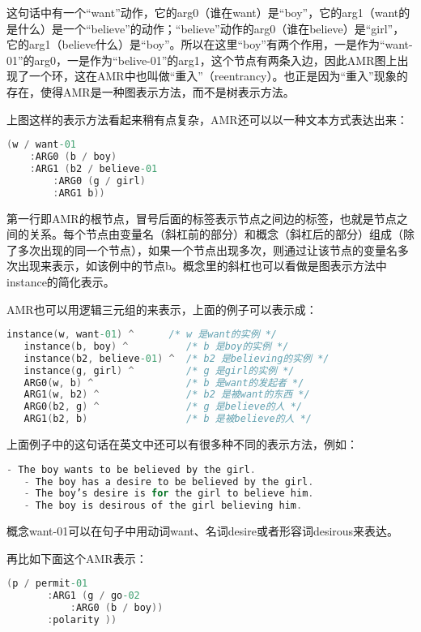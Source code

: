 \documentclass[master, winfont]{njuthesis}
\begin{document}
这句话中有一个“want”动作，它的arg0（谁在want）是“boy”，它的arg1（want的是什么）是一个“believe”的动作；“believe”动作的arg0（谁在believe）是“girl”，它的arg1（believe什么）是“boy”。所以在这里“boy”有两个作用，一是作为“want-01”的arg0，一是作为“belive-01”的arg1，这个节点有两条入边，因此AMR图上出现了一个环，这在AMR中也叫做“重入”（reentrancy）。也正是因为“重入”现象的存在，使得AMR是一种图表示方法，而不是树表示方法。

上图这样的表示方法看起来稍有点复杂，AMR还可以以一种文本方式表达出来：

\begin{lstlisting}[language=C]
(w / want-01 
   	:ARG0 (b / boy)
	:ARG1 (b2 / believe-01
		:ARG0 (g / girl)
		:ARG1 b))
\end{lstlisting}
 

第一行即AMR的根节点，冒号后面的标签表示节点之间边的标签，也就是节点之间的关系。每个节点由变量名（斜杠前的部分）和概念（斜杠后的部分）组成（除了多次出现的同一个节点），如果一个节点出现多次，则通过让该节点的变量名多次出现来表示，如该例中的节点b。概念里的斜杠也可以看做是图表示方法中instance的简化表示。

AMR也可以用逻辑三元组的来表示，上面的例子可以表示成：
\begin{lstlisting}[language=C]
   instance(w, want-01) ^      /* w 是want的实例 */ 
   instance(b, boy) ^          /* b 是boy的实例 */ 
   instance(b2, believe-01) ^  /* b2 是believing的实例 */ 
   instance(g, girl) ^         /* g 是girl的实例 */ 
   ARG0(w, b) ^                /* b 是want的发起者 */ 
   ARG1(w, b2) ^               /* b2 是被want的东西 */ 
   ARG0(b2, g) ^               /* g 是believe的人 */ 
   ARG1(b2, b)                 /* b 是被believe的人 */
\end{lstlisting}

上面例子中的这句话在英文中还可以有很多种不同的表示方法，例如：
\begin{lstlisting}[language=C]
   - The boy wants to be believed by the girl.
   - The boy has a desire to be believed by the girl.
   - The boy’s desire is for the girl to believe him.
   - The boy is desirous of the girl believing him.
\end{lstlisting}

概念want-01可以在句子中用动词want、名词desire或者形容词desirous来表达。

再比如下面这个AMR表示：
\begin{lstlisting}[language=C]
   (p / permit-01
       :ARG1 (g / go-02
           :ARG0 (b / boy))
       :polarity ))
\end{lstlisting}
\end{document}
